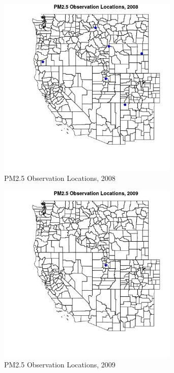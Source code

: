 \begin{figure} 
\centering  
\includegraphics[width=0.77\textwidth]{Code_Outputs/Report_PM25_Step4_part_e_de_duplicated_aves_ML_input_PlotLoc2008.jpg} 
\caption{\label{fig:Report_PM25_Step4_part_e_de_duplicated_aves_ML_inputPlotLoc2008}PM2.5 Observation Locations, 2008} 
\end{figure} 
 

\begin{figure} 
\centering  
\includegraphics[width=0.77\textwidth]{Code_Outputs/Report_PM25_Step4_part_e_de_duplicated_aves_ML_input_PlotLoc2009.jpg} 
\caption{\label{fig:Report_PM25_Step4_part_e_de_duplicated_aves_ML_inputPlotLoc2009}PM2.5 Observation Locations, 2009} 
\end{figure} 
 


